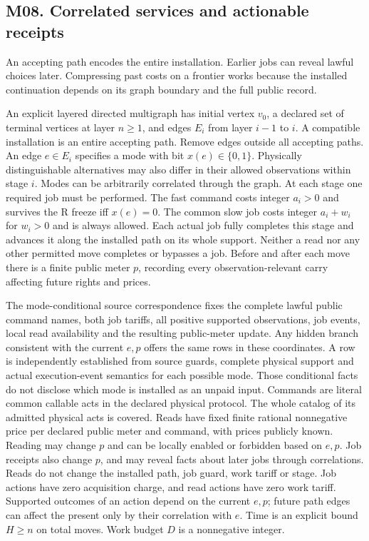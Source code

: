 \subsection{M08. Correlated services and actionable receipts}

\label{ext:m08}

An accepting path encodes the entire installation. Earlier jobs can reveal lawful choices later. Compressing past costs on a frontier works because the installed continuation depends on its graph boundary and the full public record.

An explicit layered directed multigraph has initial vertex \(v_0\), a declared set of terminal vertices at layer \(n\ge1\), and edges \(E_i\) from layer \(i-1\) to \(i\). A compatible installation is an entire accepting path. Remove edges outside all accepting paths. An edge \(e\in E_i\) specifies a mode with bit \(x(e)\in\{0,1\}\). Physically distinguishable alternatives may also differ in their allowed observations within stage \(i\). Modes can be arbitrarily correlated through the graph. At each stage one required job must be performed. The fast command costs integer \(a_i>0\) and survives the R freeze iff \(x(e)=0\). The common slow job costs integer \(a_i+w_i\) for \(w_i>0\) and is always allowed. Each actual job fully completes this stage and advances it along the installed path on its whole support. Neither a read nor any other permitted move completes or bypasses a job. Before and after each move there is a finite public meter \(p\), recording every observation-relevant carry affecting future rights and prices.

The mode-conditional source correspondence fixes the complete lawful public command names, both job tariffs, all positive supported observations, job events, local read availability and the resulting public-meter update. Any hidden branch consistent with the current \(e,p\) offers the same rows in these coordinates. A row is independently established from source guards, complete physical support and actual execution-event semantics for each possible mode. Those conditional facts do not disclose which mode is installed as an unpaid input. Commands are literal common callable acts in the declared physical protocol. The whole catalog of its admitted physical acts is covered. Reads have fixed finite rational nonnegative price per declared public meter and command, with prices publicly known. Reading may change \(p\) and can be locally enabled or forbidden based on \(e,p\). Job receipts also change \(p\), and may reveal facts about later jobs through correlations. Reads do not change the installed path, job guard, work tariff or stage. Job actions have zero acquisition charge, and read actions have zero work tariff. Supported outcomes of an action depend on the current \(e,p\); future path edges can affect the present only by their correlation with \(e\). Time is an explicit bound \(H\ge n\) on total moves. Work budget \(D\) is a nonnegative integer.

